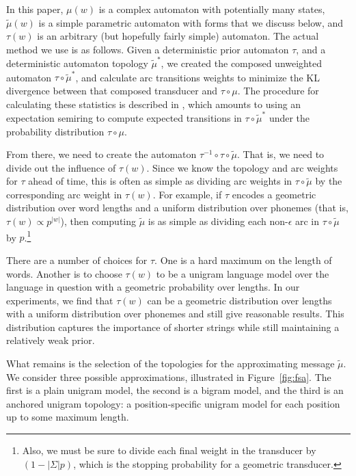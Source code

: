 \documentclass[11pt,a4paper]{article}
\begin{document}
In this paper, $\mu(w)$ is a complex automaton with potentially
many states, $\tilde\mu(w)$ is a simple parametric automaton with
forms that we discuss below, and $\tau(w)$ is an arbitrary (but
hopefully fairly simple) automaton. The actual method we use is as
follows. Given a deterministic prior automaton $\tau$, and a
deterministic automaton topology $\tilde\mu^*$, we created the
composed unweighted automaton $\tau \circ \tilde\mu^*$, and calculate
arc transitions weights to minimize the KL divergence between that
composed transducer and $\tau\circ\mu$. The procedure for calculating
these statistics is described in , which
amounts to using an expectation semiring \cite{eisner2001expectation}
to compute expected transitions in $\tau\circ\tilde\mu^*$ under the
probability distribution $\tau\circ\mu$.

From there, we need to create the automaton $\tau^{-1}
\circ\tau\circ\tilde\mu$. That is, we need to divide out the influence
of $\tau(w)$. Since we know the topology and arc weights for $\tau$
ahead of time, this is often as simple as dividing arc weights in
$\tau\circ\tilde\mu$ by the corresponding arc weight in $\tau(w)$.
For example, if $\tau$ encodes a geometric distribution over word
lengths and a uniform distribution over phonemes (that is, $\tau(w)
\propto {p^{|w|}}$), then computing $\tilde\mu$ is as simple as
dividing each non-$\epsilon$ arc in $\tau\circ\tilde\mu$ by $p$.\footnote{Also,
we must be sure to divide each final weight in the transducer
by $(1-|\Sigma| p)$, which is the stopping probability for a geometric
transducer.}

There are a number of choices for $\tau$. One is a hard maximum on
the length of words. Another is to choose $\tau(w)$ to be a unigram
language model over the language in question with a geometric
probability over lengths. In our experiments, we find that $\tau(w)$
can be a geometric distribution over lengths with a uniform
distribution over phonemes and still give reasonable results.
This distribution captures the importance of shorter strings while
still maintaining a relatively weak prior.

What remains is the selection of the topologies for the approximating
message $\tilde\mu$. We consider three possible approximations,
illustrated in Figure~\ref{fig:fsa}. The first is a plain unigram
model, the second is a bigram model, and the third is an anchored
unigram topology: a position-specific unigram model for each position
up to some maximum length.
\end{document}
